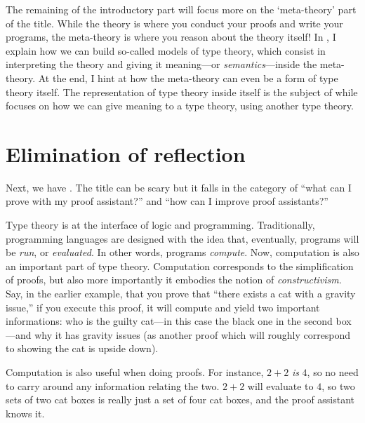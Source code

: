 The remaining of the introductory part will focus more on the `meta-theory'
part of the title. While the theory is where you conduct your proofs and write
your programs, the meta-theory is where you reason about the theory itself!
In , I explain how we can build so-called models of type theory,
which consist in interpreting the theory and giving it meaning---or
\emph{semantics}---inside the meta-theory. At the end, I hint at how the
meta-theory can even be a form of type theory itself. The representation of
type theory inside itself is the subject of  while
 focuses on how we can give meaning to a type theory, using
another type theory.

\section{Elimination of reflection}

Next, we have . The title can be scary but it falls in
the category of ``what can I prove with my proof assistant?'' and
``how can I improve proof assistants?''

Type theory is at the interface of logic and programming. Traditionally,
programming languages are designed with the idea that, eventually, programs
will be \emph{run}, or \emph{evaluated}. In other words, programs
\emph{compute}.
Now, computation is also an important part of type theory. Computation
corresponds to the simplification of proofs, but also more importantly it
embodies the notion of \emph{constructivism}. Say, in the earlier example,
that you prove that ``there exists a cat with a gravity issue,'' if you execute
this proof, it will compute and yield two important informations: who is the
guilty cat---in this case the black one in the second box---and why it has
gravity issues (as another proof which will roughly correspond to showing the
cat is upside down).

Computation is also useful when doing proofs. For instance, \(2 + 2\) \emph{is}
\(4\), so no need to carry around any information relating the two. \(2 + 2\)
will evaluate to \(4\), so two sets of two cat boxes is really just a set of
four cat boxes, and the proof assistant knows it.

